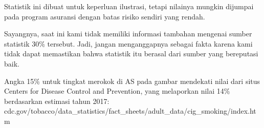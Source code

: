 \item[\ref{binomialModel}]
    Statistik ini dibuat untuk keperluan ilustrasi, tetapi nilainya mungkin
    dijumpai pada program asuransi dengan batas risiko sendiri yang rendah.
\item[\ref{binomialModel}]
    Sayangnya, saat ini kami tidak memiliki informasi tambahan mengenai
    sumber statistik 30\% tersebut. Jadi, jangan menganggapnya sebagai fakta
    karena kami tidak dapat memastikan bahwa statistik itu berasal dari
    sumber yang bereputasi baik.
\item[\ref{binomialModel}]
    Angka 15\% untuk tingkat merokok di AS pada gambar mendekati nilai dari situs
    Centers for Disease Control and Prevention, yang melaporkan nilai 14\%
    berdasarkan estimasi tahun 2017: \\
        {cdc.gov/tobacco/data\_statistics/fact\_sheets/adult\_data/cig\_smoking/index.htm}

